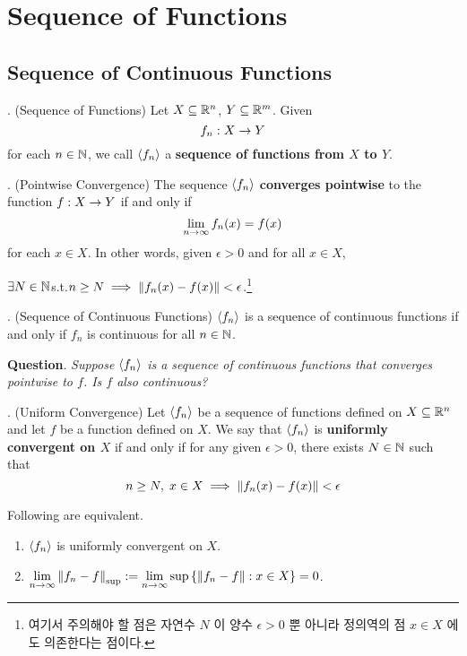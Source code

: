 \chapter{Sequence of Functions}

\section{Sequence of Continuous Functions}

. (Sequence of Functions) Let \(X \subseteq \mathbb{R}^n\), \(Y \subseteq \mathbb{R}^m\). Given
\[
	f_n: X\rightarrow Y
\]
for each \(n\in \mathbb{N}\), we call \(\left\langle f_n \right\rangle\) a \textbf{sequence of functions from \(X\) to \(Y\)}.

. (Pointwise Convergence) The sequence \(\left\langle f_n \right\rangle\) \textbf{converges pointwise} to the function \(f: X \rightarrow Y\) if and only if
\[
	\lim_{n\rightarrow \infty} f_n(x) = f(x)
\]
for each \(x \in X\). In other words, given \(\epsilon > 0\) and for all \(x \in X\),
\begin{center}
	\(\exists N\in \mathbb{N}\)\quad  s.t.\quad \(n \geq N \implies \left\lVert f_n(x) - f(x)\right\rVert < \epsilon\).\footnote{여기서 주의해야 할 점은 자연수 \(N\) 이 양수 \(\epsilon > 0\) 뿐 아니라 정의역의 점 \(x\in X\) 에도 의존한다는 점이다.}
\end{center}

. (Sequence of Continuous Functions) \(\left\langle f_n \right\rangle\) is a sequence of continuous functions if and only if \(f_n\) is continuous for all \(n\in \mathbb{N}\).

\textbf{Question}. \textit{Suppose \(\left\langle f_n \right\rangle\) is a sequence of continuous functions that converges pointwise to \(f\). Is \(f\) also continuous?}

. (Uniform Convergence) Let \(\left\langle f_n \right\rangle\) be a sequence of functions defined on \(X \subseteq \mathbb{R}^n\) and let \(f\) be a function defined on \(X\). We say that \(\left\langle f_n \right\rangle\) is \textbf{uniformly convergent on \(X\)} if and only if for any given \(\epsilon > 0\), there exists \(N\in \mathbb{N}\) such that
\[
	n\geq N,\; x\in X \implies \left\lVert f_n(x) - f(x)\right\rVert < \epsilon
\]

\clearpage
{} Following are equivalent.
\begin{enumerate}
	\item \(\left\langle f_n \right\rangle\) is uniformly convergent on \(X\).
	\item \(\displaystyle \lim_{n\rightarrow\infty} \left\lVert f_n-f\right\rVert_{\sup} := \lim_{n\rightarrow \infty} \sup \left\{\left\lVert f_n-f\right\rVert: x\in X\right\} = 0\).
\end{enumerate}


